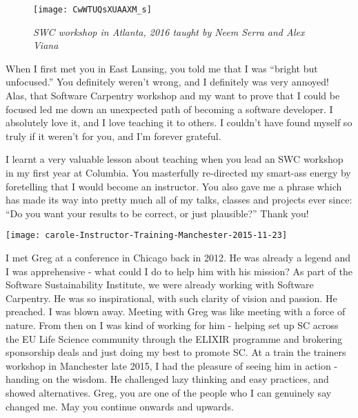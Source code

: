 
\newpage

\begin{figure}[h!]
\begin{center}
\texttt{[image: CwWTUQsXUAAXM\_s]}
\caption*{\textit{SWC workshop in Atlanta, 2016 taught by Neem Serra and Alex Viana}}
\end{center}
\end{figure}

When I first met you in East Lansing, you told me that I was ``bright but
unfocused.''  You definitely weren't wrong, and I definitely was very annoyed!
Alas, that Software Carpentry workshop and my want to prove that I could be
focused led me down an unexpected path of becoming a software developer.  I
absolutely love it, and I love teaching it to others.  I couldn't have found
myself so truly if it weren't for you, and I'm forever grateful.


\newpage

I learnt a very valuable lesson about teaching when you lead an SWC workshop in
my first year at Columbia.  You masterfully re-directed my smart-ass energy by
foretelling that I would become an instructor. You also gave me a phrase which
has made its way into pretty much all of my talks, classes and projects ever
since: ``Do you want your results to be correct, or just plausible?'' Thank
you!


\newpage
\texttt{[image: carole-Instructor-Training-Manchester-2015-11-23]}

I met Greg at  a conference in Chicago back in 2012. He was already a legend
and I was apprehensive - what could I do to help him with his mission? As part
of the Software Sustainability Institute, we were already working with Software
Carpentry. He was so inspirational, with such clarity of vision and passion. He
preached. I was blown away.  Meeting with Greg was like meeting with a force of
nature. From then on I was kind of working for him - helping set up SC across
the EU Life Science community through the ELIXIR programme and brokering
sponsorship deals and just doing my best  to promote SC. At a train the
trainers workshop in Manchester late 2015, I had the pleasure of seeing him in
action - handing on the wisdom. He challenged lazy thinking and easy practices,
and showed alternatives. Greg, you are one of the people who I can genuinely
say changed me. May you continue onwards and upwards.

